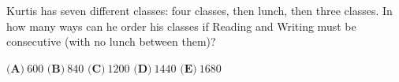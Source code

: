 Kurtis has seven different classes: four classes, then lunch, then three classes. In how many ways can he order his classes if Reading and Writing must be consecutive (with no lunch between them)?

$\textbf{(A)}\ $$600$ \qquad $\textbf{(B)}\ $$840$ \qquad $\textbf{(C)}\ $$1200$ \qquad $\textbf{(D)}\ $$1440$ \qquad $\textbf{(E)}\ $$1680$
